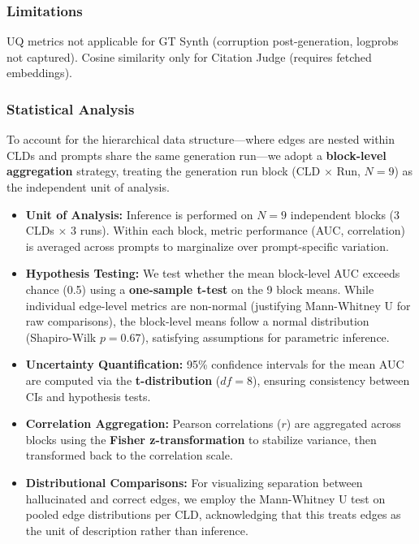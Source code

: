 \subsubsection{Limitations}
UQ metrics not applicable for GT Synth (corruption post-generation, logprobs not captured). Cosine similarity only for Citation Judge (requires fetched embeddings).

\subsubsection{Statistical Analysis}
\label{sec:rq2_analysis}

To account for the hierarchical data structure---where edges are nested within CLDs and prompts share the same generation run---we adopt a \textbf{block-level aggregation} strategy, treating the generation run block (CLD $\times$ Run, $N=9$) as the independent unit of analysis.

\begin{itemize}[noitemsep]
    \item \textbf{Unit of Analysis:} Inference is performed on $N=9$ independent blocks (3 CLDs $\times$ 3 runs). Within each block, metric performance (AUC, correlation) is averaged across prompts to marginalize over prompt-specific variation.
    \item \textbf{Hypothesis Testing:} We test whether the mean block-level AUC exceeds chance (0.5) using a \textbf{one-sample t-test} on the 9 block means. While individual edge-level metrics are non-normal (justifying Mann-Whitney U for raw comparisons), the block-level means follow a normal distribution (Shapiro-Wilk $p=0.67$), satisfying assumptions for parametric inference.
    \item \textbf{Uncertainty Quantification:} 95\% confidence intervals for the mean AUC are computed via the \textbf{t-distribution} ($df=8$), ensuring consistency between CIs and hypothesis tests.
    \item \textbf{Correlation Aggregation:} Pearson correlations ($r$) are aggregated across blocks using the \textbf{Fisher z-transformation} to stabilize variance, then transformed back to the correlation scale.
    \item \textbf{Distributional Comparisons:} For visualizing separation between hallucinated and correct edges, we employ the Mann-Whitney U test on pooled edge distributions per CLD, acknowledging that this treats edges as the unit of description rather than inference.
\end{itemize}

